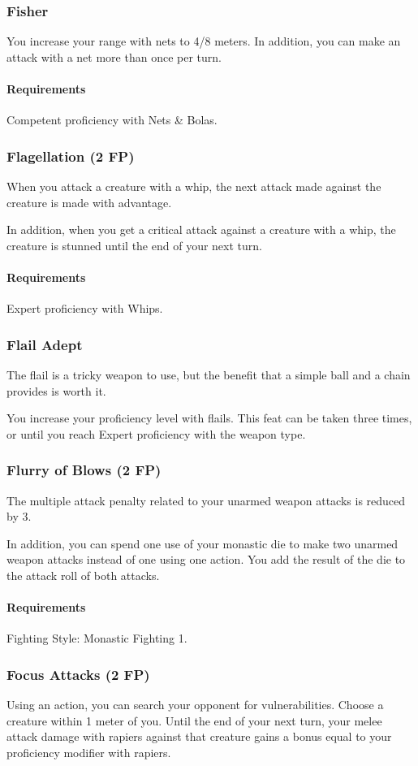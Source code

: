 \subsubsection{Fisher} \label{feat::fisher}
    You increase your range with nets to 4/8 meters.
    In addition, you can make an attack with a net more than once per turn.
    \paragraph{Requirements} Competent proficiency with Nets \& Bolas.
\subsubsection{Flagellation (2 FP)} \label{feat::flagellation}
    When you attack a creature with a whip, the next attack made against the creature is made with advantage.

    In addition, when you get a critical attack against a creature with a whip, the creature is stunned until the end of your next turn.
    \paragraph{Requirements} Expert proficiency with Whips.
\subsubsection{Flail Adept} \label{feat::flailadept}
    The flail is a tricky weapon to use, but the benefit that a simple ball and a chain provides is worth it.

    You increase your proficiency level with flails.
    This feat can be taken three times, or until you reach Expert proficiency with the weapon type.
\subsubsection{Flurry of Blows (2 FP)} \label{feat::flurryofblows}
    The multiple attack penalty related to your unarmed weapon attacks is reduced by 3.

    In addition, you can spend one use of your monastic die to make two unarmed weapon attacks instead of one using one action.
    You add the result of the die to the attack roll of both attacks.
    \paragraph{Requirements} Fighting Style: Monastic Fighting 1.
\subsubsection{Focus Attacks (2 FP)} \label{feat::focusattacks}
    Using an action, you can search your opponent for vulnerabilities.
    Choose a creature within 1 meter of you.
    Until the end of your next turn, your melee attack damage with rapiers against that creature gains a bonus equal to your proficiency modifier with rapiers.
